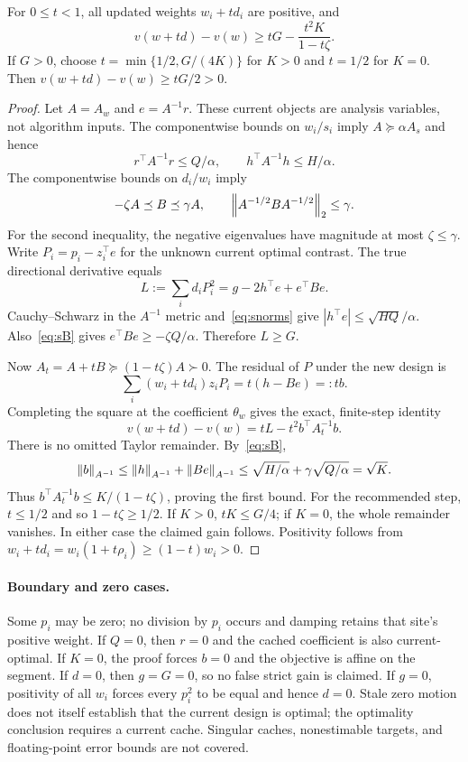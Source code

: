 \documentclass[11pt]{article}
\begin{document}
\begin{theorem}\label{thm:smain}
For $0\le t<1$, all updated weights $w_i+td_i$ are positive, and
\[
 v(w+td)-v(w)\ge tG-\frac{t^2K}{1-t\zeta}.
\]
If $G>0$, choose $t=\min\{1/2,G/(4K)\}$ for $K>0$ and $t=1/2$ for $K=0$. Then $v(w+td)-v(w)\ge tG/2>0$.
\end{theorem}
\begin{proof}
Let $A=A_w$ and $e=A^{-1}r$. These current objects are analysis variables, not algorithm inputs. The componentwise bounds on $w_i/s_i$ imply $A\succeq\alpha A_s$ and hence
\begin{equation}\label{eq:snorms}
 r^\top A^{-1}r\le Q/\alpha,
 \qquad h^\top A^{-1}h\le H/\alpha.
\end{equation}
The componentwise bounds on $d_i/w_i$ imply
\begin{equation}\label{eq:sB}
 -\zeta A\preceq B\preceq\gamma A,\qquad
 \left\lVert A^{-1/2}BA^{-1/2}\right\rVert_2\le\gamma.
\end{equation}
For the second inequality, the negative eigenvalues have magnitude at most $\zeta\le\gamma$.
Write $P_i=p_i-z_i^\top e$ for the unknown current optimal contrast.
The true directional derivative equals
\[
 L:=\sum_i d_iP_i^2=g-2h^\top e+e^\top Be.
\]
Cauchy--Schwarz in the $A^{-1}$ metric and~\eqref{eq:snorms} give
$|h^\top e|\le\sqrt{HQ}/\alpha$.
Also~\eqref{eq:sB} gives $e^\top Be\ge-\zeta Q/\alpha$.
Therefore $L\ge G$.

Now $A_t=A+tB\succeq(1-t\zeta)A\succ0$.
The residual of $P$ under the new design is
\[
 \sum_i(w_i+td_i)z_iP_i=t(h-Be)=:tb.
\]
Completing the square at the coefficient $\theta_w$ gives the exact, finite-step identity
\begin{equation}\label{eq:sexactchange}
 v(w+td)-v(w)=tL-t^2b^\top A_t^{-1}b.
\end{equation}
There is no omitted Taylor remainder. By~\eqref{eq:sB},
\[
 \left\lVert b\right\rVert_{A^{-1}}
 \le\left\lVert h\right\rVert_{A^{-1}}+\left\lVert Be\right\rVert_{A^{-1}}
 \le\sqrt{H/\alpha}+\gamma\sqrt{Q/\alpha}=\sqrt K.
\]
Thus $b^\top A_t^{-1}b\le K/(1-t\zeta)$, proving the first bound.
For the recommended step, $t\le1/2$ and so $1-t\zeta\ge1/2$.
If $K>0$, $tK\le G/4$; if $K=0$, the whole remainder vanishes.
In either case the claimed gain follows. Positivity follows from
$w_i+td_i=w_i(1+t\rho_i)\ge(1-t)w_i>0$.
\end{proof}

\paragraph{Boundary and zero cases.}
Some $p_i$ may be zero; no division by $p_i$ occurs and damping retains that site's positive weight. If $Q=0$, then $r=0$ and the cached coefficient is also current-optimal. If $K=0$, the proof forces $b=0$ and the objective is affine on the segment. If $d=0$, then $g=G=0$, so no false strict gain is claimed. If $g=0$, positivity of all $w_i$ forces every $p_i^2$ to be equal and hence $d=0$. Stale zero motion does not itself establish that the current design is optimal; the optimality conclusion requires a current cache. Singular caches, nonestimable targets, and floating-point error bounds are not covered.
\end{document}

